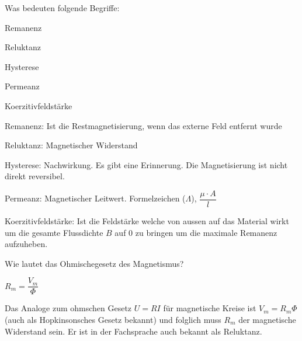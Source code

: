 
\begin{karte}{Was bedeuten folgende Begriffe:\\
	\begin{compactitem}
		\item Remanenz
		\item Reluktanz
		\item Hysterese
		\item Permeanz
		\item Koerzitivfeldstärke
	\end{compactitem}}

	\begin{compactitem}
		\item Remanenz: Ist die Restmagnetisierung, wenn das externe Feld entfernt wurde
		\item Reluktanz: Magnetischer Widerstand
		\item Hysterese: Nachwirkung. Es gibt eine Erinnerung. Die Magnetisierung ist nicht direkt reversibel.
		\item Permeanz: Magnetischer Leitwert. Formelzeichen ($\Lambda$), $\dfrac{\mu \cdot A}{l}$
		\item Koerzitivfeldstärke: Ist die Feldstärke welche von aussen auf das Material wirkt um die gesamte Flussdichte $B$ auf $0$ zu bringen um die maximale Remanenz aufzuheben.
	\end{compactitem}
\end{karte}

\begin{karte}{Wie lautet das Ohmischegesetz des Magnetismus?}
	\begin{huge}
		\begin{center}
			$R_{m}=\dfrac{V_{m}}{\Phi}$\\
		\end{center}
	\end{huge}
	Das Analoge zum ohmschen Gesetz $U=R I$ für magnetische Kreise ist $V_{m}=R_{m} \Phi$ (auch als Hopkinsonsches Gesetz bekannt) und folglich muss $R_{m}$ der magnetische Widerstand sein. Er ist in der Fachsprache auch bekannt als Reluktanz.
\end{karte}